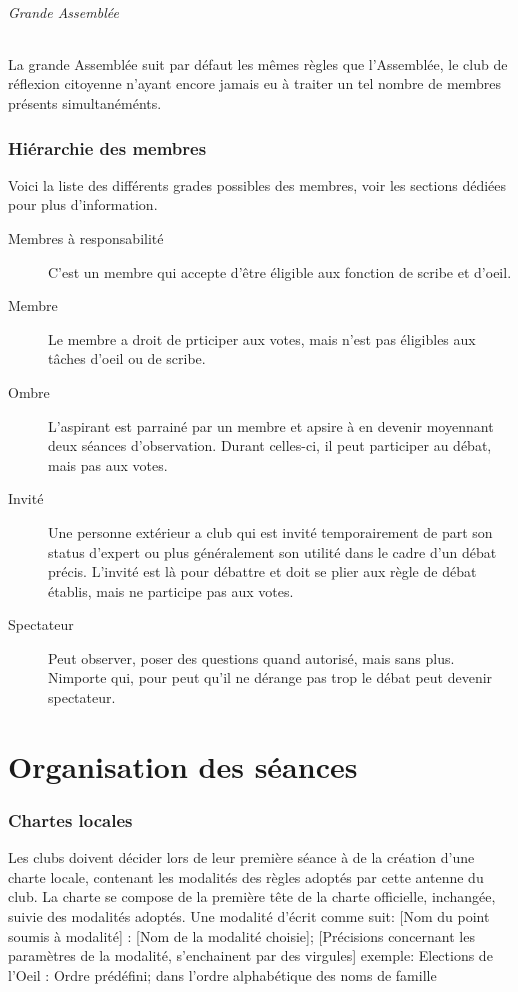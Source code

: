 \documentclass[a4paper,12pt]{article}
\begin{document}
\paragraph{Grande Assemblée}
La grande Assemblée suit par défaut les mêmes règles que l'Assemblée, le club de réflexion citoyenne n'ayant encore jamais eu à traiter un tel nombre de membres présents simultanéménts. 

\section{Hiérarchie des membres}
Voici la liste des différents grades possibles des membres, voir les sections dédiées pour plus d'information.
\begin{description}
 \item[Membres à responsabilité] C'est un membre qui accepte d'être éligible aux fonction de scribe et d'oeil.
 \item[Membre] Le membre a droit de prticiper aux votes, mais n'est pas éligibles aux tâches d'oeil ou de scribe.
 \item[Ombre] L'aspirant est parrainé par un membre et apsire à en devenir moyennant deux séances d'observation. Durant celles-ci, il peut participer au débat, mais pas aux votes.
 \item[Invité] Une personne extérieur a club qui est invité temporairement de part son status d'expert ou plus généralement son utilité dans le cadre d'un débat précis. L'invité est là pour débattre et doit se plier aux règle de débat établis, mais ne participe pas aux votes.
 \item[Spectateur] Peut observer, poser des questions quand autorisé, mais sans plus. Nimporte qui, pour peut qu'il ne dérange pas trop le débat peut devenir spectateur.
\end{description}


\newpage
\part{Organisation des séances}

\section{Chartes locales}
Les clubs doivent décider lors de leur première séance à de la création d'une charte locale, contenant les modalités des règles adoptés par cette antenne du club. La charte se compose de la première tête de la charte officielle, inchangée, suivie des modalités adoptés. Une modalité d'écrit comme suit:
[Nom du point soumis à modalité] : [Nom de la modalité choisie]; [Précisions concernant les paramètres de la modalité, s'enchainent par des virgules]
exemple: Elections de l'Oeil : Ordre prédéfini; dans l'ordre alphabétique des noms de famille
\end{document}
